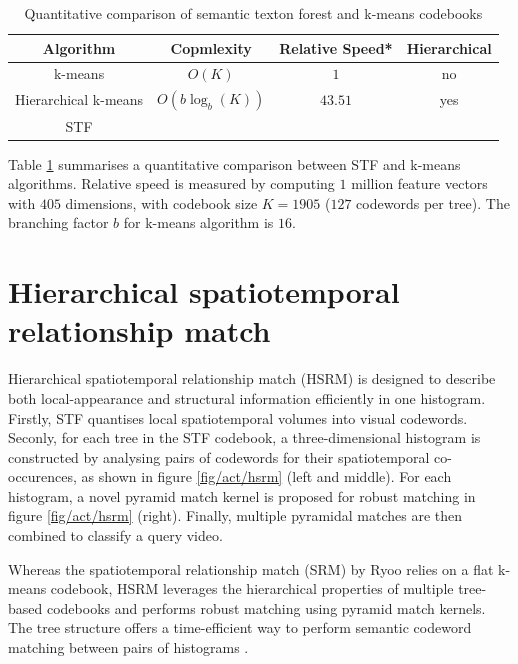 \begin{table}
	\begin{center}
		\begin{tabular}{|c|c|c|c|}
			\hline
			\textbf{ Algorithm} & \textbf{ Copmlexity} & \textbf{ Relative Speed}* & \textbf{ Hierarchical} \\
			\hline
			k-means & $O(K)$ & $1$ & no \\
			Hierarchical k-means & $O(b\log_{b}(K))$ & $43.51$ & yes \\
			{STF} & \textbf{\color{blue}{ $ O(\log_{2}(K)) $ }} & \textbf{\color{blue}{$559.86$}} & \textbf{\color{blue}{yes}}\\
			\hline
		\end{tabular}
	\end{center}
	\caption{Quantitative comparison of semantic texton forest and k-means codebooks}
	\label{tab/act/codebook}
\end{table}

Table \ref{tab/act/codebook} summarises a quantitative comparison between STF and k-means algorithms. Relative speed is measured by computing $1$ million feature vectors with $405$ dimensions, with codebook size $K = 1905$ ($127$ codewords per tree). The branching factor $b$ for k-means algorithm is $16$.

\section{Hierarchical spatiotemporal relationship match}
\label{sec/act/HSRM}

Hierarchical spatiotemporal relationship match (HSRM) is designed to describe both local-appearance and structural information efficiently in one histogram. 
Firstly, STF quantises local spatiotemporal volumes into visual codewords. 
Seconly, for each tree in the STF codebook, a three-dimensional histogram is constructed by analysing pairs of codewords for their spatiotemporal co-occurences, as shown in figure \ref{fig/act/hsrm} (left and middle). 
For each histogram, a novel pyramid match kernel is proposed for robust matching in figure \ref{fig/act/hsrm} (right). 
Finally, multiple pyramidal matches are then combined to classify a query video. 

Whereas the spatiotemporal relationship match (SRM) by Ryoo \etal \cite{Ryoo2009} relies on a flat k-means codebook, HSRM leverages the hierarchical properties of multiple tree-based codebooks and performs robust matching using pyramid match kernels. The tree structure offers a time-efficient way to perform semantic codeword matching between pairs of histograms \cite{Grauman2005}.

